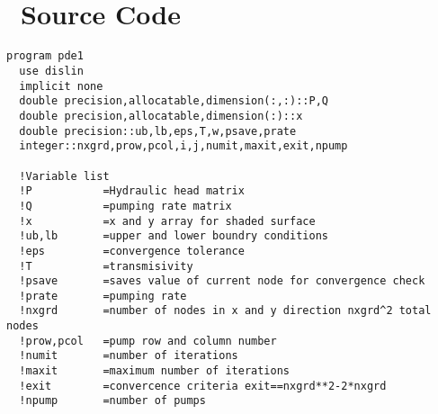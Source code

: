 \documentclass[titlepage,11pt]{article}
\begin{document}
\appendix
\newcommand{\appsection}[1]{\let\oldthesection\thesection
  \renewcommand{\thesection}{Appendix \oldthesection}
  \section{#1}\let\thesection\oldthesection}
\appsection{\\~Source Code} \label{sec:source}
\begin{singlespacing}
\begin{small}
\begin{Verbatim}[frame=single]
program pde1
  use dislin
  implicit none
  double precision,allocatable,dimension(:,:)::P,Q
  double precision,allocatable,dimension(:)::x
  double precision::ub,lb,eps,T,w,psave,prate
  integer::nxgrd,prow,pcol,i,j,numit,maxit,exit,npump

  !Variable list
  !P           =Hydraulic head matrix
  !Q           =pumping rate matrix
  !x           =x and y array for shaded surface
  !ub,lb       =upper and lower boundry conditions
  !eps         =convergence tolerance
  !T           =transmisivity
  !psave       =saves value of current node for convergence check
  !prate       =pumping rate
  !nxgrd       =number of nodes in x and y direction nxgrd^2 total nodes
  !prow,pcol   =pump row and column number
  !numit       =number of iterations
  !maxit       =maximum number of iterations
  !exit        =convercence criteria exit==nxgrd**2-2*nxgrd
  !npump       =number of pumps


\end{Verbatim}
\end{small}
\end{singlespacing}
\end{document}

